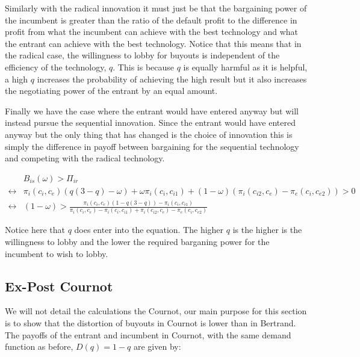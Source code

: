 Similarly with the radical innovation it must just be that the bargaining power of the incumbent is greater than the ratio of the default profit to the difference in profit from what the incumbent can achieve with the best technology and what the entrant can achieve with the best technology. Notice that this means that in the radical case, the willingness to lobby for buyouts is independent of the efficiency of the technology, $q$. This is because $q$ is equally harmful as it is helpful, a high $q$ increases the probability of achieving the high result but it also increases the negotiating power of the entrant by an equal amount. 

Finally we have the case where the entrant would have entered anyway but will instead pursue the sequential innovation. Since the entrant would have entered anyway but the only thing that has changed is the choice of innovation this is simply the difference in payoff between bargaining for the sequential technology and competing with the radical technology. 

\begin{align*}
&B_{is}(\omega)>\Pi_{ir} \\
\leftrightarrow &\pi_i(c_i,c_e)(q(3-q) -\omega) 
+\omega \pi_i(c_i,c_{i1}) 
 +(1-\omega)(\pi_i(c_{i2},c_e)-\pi_e(c_{i},c_{e2})) 
> 0 \\
\leftrightarrow &
(1-\omega)> \frac{\pi_i(c_i,c_e)(1-q(3-q))-\pi_i(c_i,c_{i1})}{\pi_i(c_i,c_e)-\pi_i(c_i,c_{i1})+\pi_i(c_{i2},c_e)-\pi_e(c_{i},c_{e2})}  
\end{align*}

Notice here that $q$ does enter into the equation. The higher $q$ is the higher is the willingness to lobby and the lower the required barganing power for the incumbent to wish to lobby. 

\subsection{Ex-Post Cournot}

We will not detail the calculations the Cournot, our main purpose for this section is to show that the distortion of buyouts in Cournot is lower than in Bertrand. The payoffs of the entrant and incumbent in Cournot, with the same demand function as before, $D(q)=1-q$ are given by:

